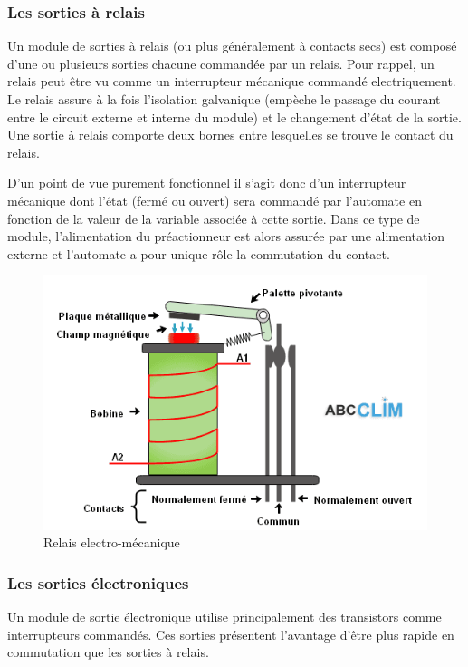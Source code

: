 \documentclass[11pt]{article}
\begin{document}
\subsubsection{Les sorties à relais}

Un module de sorties à relais (ou plus généralement à contacts secs) est composé d'une ou plusieurs sorties chacune commandée par un relais. Pour rappel, un relais peut être vu comme un interrupteur mécanique commandé electriquement.
Le relais assure à la fois l'isolation galvanique (empèche le passage du courant entre le circuit externe et interne du module) et le changement d'état de la sortie. Une sortie à relais comporte deux bornes entre lesquelles se trouve le contact du relais.

D'un point de vue purement fonctionnel il s'agit donc d'un interrupteur mécanique dont l'état (fermé ou ouvert) sera commandé par l'automate en fonction de la valeur de la variable associée à cette sortie.
Dans ce type de module, l'alimentation du préactionneur est alors assurée par une alimentation externe et l'automate a pour unique rôle la commutation du contact.



\begin{figure}[h]
	\centering
	\includegraphics[width=.8\textwidth, height=.15\textheight, keepaspectratio]{images/relais-electromecanique.png}
	\caption{Relais electro-mécanique}
	\label{fig:captPassif}
\end{figure}


\subsubsection{Les sorties électroniques}
Un module de sortie électronique utilise principalement des transistors comme interrupteurs commandés. Ces sorties présentent l'avantage d'être plus rapide en commutation que les sorties à relais.
\end{document}
